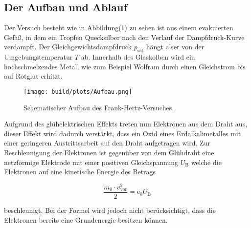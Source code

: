     \subsection{Der Aufbau und Ablauf}

        \noindent Der Versuch besteht wie in Abbildung(\ref{img:aufb}) zu sehen ist aus einem evakuierten Gefäß, in dem ein Tropfen Quecksilber 
        nach den Verlauf der Dampfdruck-Kurve verdampft. Der Gleichgewichtsdampfdruck $p_\text{sät}$ hängt alser von der Umgebungstemperatur $T$ ab.
        Innerhalb des Glaskolben wird ein hochschmelzendes Metall wie zum Beispiel Wolfram durch einen Gleichstrom bis auf Rotglut erhitzt.
        
        \begin{figure}[ht]
            \centering
            \texttt{[image: build/plots/Aufbau.png]}
            \caption{Schematischer Aufbau des Frank-Hertz-Versuches.}
            \label{img:aufb}
        \end{figure}

        \noindent Aufgrund des glühelektrischen Effekts treten nun Elektronen aus dem Draht aus, dieser Effekt wird dadurch verstärkt, dass ein 
        Oxid eines Erdalkalimetalles mit einer geringeren Austrittsarbeit auf den Draht aufgetragen wird. Zur Beschleunigung der Elektronen ist 
        gegenüber von dem Glühdraht eine netzförmige Elektrode mit einer positiven Gleichspannung $U_\text{B}$ welche die Elektronen auf eine 
        kinetische Energie des Betrags

        \begin{equation*}
            \frac{m_0 \cdot v_{\text{vor}}^2}{2} = \text{e}_0 U_\text{B}
        \end{equation*}

        \noindent beschleunigt. Bei der Formel wird jedoch nicht berücksichtigt, dass die Elektronen bereits eine Grundenergie besitzen können.
        



        
